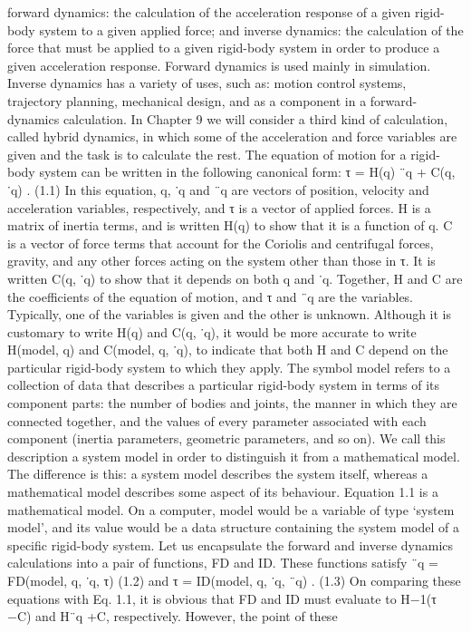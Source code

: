 forward dynamics: the calculation of the acceleration response of a given rigid-body system to a given applied force; and inverse dynamics: the calculation of the force that must be applied to a given rigid-body system in order to produce a given acceleration response. Forward dynamics is used mainly in simulation. Inverse dynamics has a variety of uses, such as: motion control systems, trajectory planning, mechanical design, and as a component in a forward-dynamics calculation. In Chapter 9 we will consider a third kind of calculation, called hybrid dynamics, in which some of the acceleration and force variables are given and the task is to calculate the rest. The equation of motion for a rigid-body system can be written in the following canonical form: τ = H(q) ¨q + C(q, ˙q) . (1.1) In this equation, q, ˙q and ¨q are vectors of position, velocity and acceleration variables, respectively, and τ is a vector of applied forces. H is a matrix of inertia terms, and is written H(q) to show that it is a function of q. C is a vector of force terms that account for the Coriolis and centrifugal forces, gravity, and any other forces acting on the system other than those in τ. It is written C(q, ˙q) to show that it depends on both q and ˙q. Together, H and C are the coefficients of the equation of motion, and τ and ¨q are the variables. Typically, one of the variables is given and the other is unknown. Although it is customary to write H(q) and C(q, ˙q), it would be more accurate to write H(model, q) and C(model, q, ˙q), to indicate that both H and C depend on the particular rigid-body system to which they apply. The symbol model refers to a collection of data that describes a particular rigid-body system in terms of its component parts: the number of bodies and joints, the manner in which they are connected together, and the values of every parameter associated with each component (inertia parameters, geometric parameters, and so on). We call this description a system model in order to distinguish it from a mathematical model. The difference is this: a system model describes the system itself, whereas a mathematical model describes some aspect of its behaviour. Equation 1.1 is a mathematical model. On a computer, model would be a variable of type ‘system model’, and its value would be a data structure containing the system model of a specific rigid-body system. Let us encapsulate the forward and inverse dynamics calculations into a pair of functions, FD and ID. These functions satisfy ¨q = FD(model, q, ˙q, τ) (1.2) and τ = ID(model, q, ˙q, ¨q) . (1.3) On comparing these equations with Eq. 1.1, it is obvious that FD and ID must evaluate to H−1(τ −C) and H¨q +C, respectively. However, the point of these

